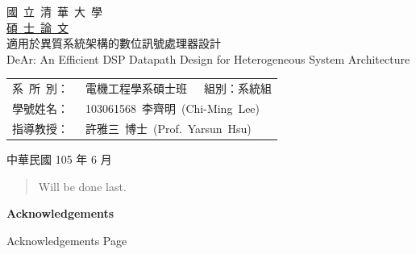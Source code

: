 \documentclass[12pt]{article}
\begin{document}
\begin{CJK}{UTF8}{bkai}

\begin{titlepage}
\begin{center}
\Huge 國~立~清~華~大~學 \\ [1.5ex]
\Huge \underline{碩~士~論~文} \\
\vspace*{10ex}
\huge 適用於異質系統架構的數位訊號處理器設計 \\
\vspace*{1ex}
\huge DeAr: An Efficient DSP Datapath Design for Heterogeneous System Architecture  \\

\null
\vfill

\Large
\begin{tabular}{r@{\centering} @{}l}
    系\ 所\ 別：~&電機工程學系碩士班\ \ \ 組別：系統組	\\ [1.5ex]
    學號姓名：~&103061568~李齊明~(Chi-Ming~Lee)      \\ [1.5ex]
    指導教授：~&許雅三~博士~(Prof.~Yarsun~Hsu)       \\
	
\end{tabular}

\vspace*{2ex}
\Large 中華民國 105 年 6 月
\end{center}
\end{titlepage}

\doublespacing
{}
\setcounter{page}{3}

\renewcommand{\abstractnamefont}{\normalfont\bfseries}
\renewcommand{\abstracttextfont}{\normalfont}
\setlength{\absleftindent}{0pt}
\setlength{\absrightindent}{0pt}

\begin{abstract}  %
	Will be done last.
\end{abstract}
\clearpage
{}

\begin{center}
\textbf{Acknowledgements}
\end{center}
Acknowledgements Page
\clearpage

\singlespacing

\tableofcontents  %
\clearpage
{}
\listoffigures  %
\clearpage
{}
\listoftables  %
\clearpage
{}
\listofalgorithms  %
\clearpage


\end{CJK}
\end{document}
